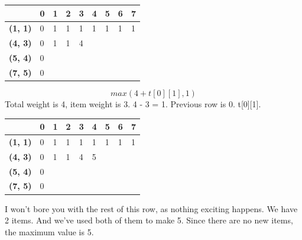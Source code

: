 \documentclass{article}
\begin{document}
\begin{center}
\begin{tabular}{|l|l|l|l|l|l|l|l|l|}
\hline
                & \textbf{0} & \textbf{1} & \textbf{2} & \textbf{3} & \textbf{4} & \textbf{5} & \textbf{6} & \textbf{7} \\ \hline
\textbf{(1, 1)} & 0          &1            &1            &1            &1            &1            &1            &1            \\ \hline
\textbf{(4, 3)} & 0          &1            &1            &4            &            &            &            &            \\ \hline
\textbf{(5, 4)} & 0          &            &            &            &            &            &            &            \\ \hline
\textbf{(7, 5)} & 0          &            &            &            &            &            &            &            \\ \hline
\end{tabular}
\end{center}
$$max(4 + t[0][1], 1)$$
Total weight is 4, item weight is 3. 4 - 3 = 1. Previous row is 0. t[0][1].
\begin{center}
\begin{tabular}{|l|l|l|l|l|l|l|l|l|}
\hline
                & \textbf{0} & \textbf{1} & \textbf{2} & \textbf{3} & \textbf{4} & \textbf{5} & \textbf{6} & \textbf{7} \\ \hline
\textbf{(1, 1)} & 0          &1            &1            &1            &1            &1            &1            &1            \\ \hline
\textbf{(4, 3)} & 0          &1            &1            &4            &5            &            &            &            \\ \hline
\textbf{(5, 4)} & 0          &            &            &            &            &            &            &            \\ \hline
\textbf{(7, 5)} & 0          &            &            &            &            &            &            &            \\ \hline
\end{tabular}
\end{center}
I won't bore you with the rest of this row, as nothing exciting happens. We have 2 items. And we've used both of them to make 5. Since there are no new items, the maximum value is 5. 
\end{document}
